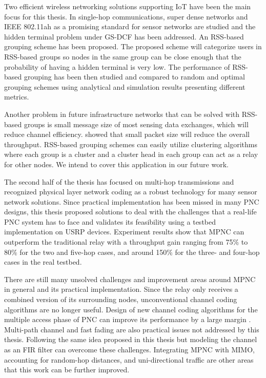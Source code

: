 \label{chapter:concl}

Two efficient wireless networking solutions supporting IoT have been the main focus for this thesis. In single-hop communications, super dense networks and IEEE 802.11ah as a promising standard for sensor networks are studied and the hidden terminal problem under GS-DCF has been addressed. An RSS-based grouping scheme has been proposed. The proposed scheme will categorize users in RSS-based groups so nodes in the same group can be close enough that the probability of having a hidden terminal is very low.
The performance of RSS-based grouping has been then studied and compared to random and optimal grouping schemes using analytical and simulation results presenting different metrics.

Another problem in future infrastructure networks that can be solved with RSS-based groups is small message size of most sensing data exchanges, which will reduce channel efficiency. \cite{bianchi2000performance} showed that small packet size will reduce the overall throughput. RSS-based grouping schemes can easily utilize clustering algorithms where each group is a cluster and a cluster head in each group can act as a relay for other nodes. We intend to cover this application in our future work.

The second half of the thesis has focused on multi-hop transmissions and recognized physical layer network coding as a robust technology for many sensor network solutions. Since practical implementation has been missed in many PNC designs, this thesis proposed solutions to deal with the challenges that a real-life PNC system has to face and validates its feasibility using a testbed implementation on USRP devices. Experiment results show that MPNC can outperform the traditional relay with a throughput gain ranging from 75\% to 80\% for the two and five-hop cases, and around 150\% for the three- and four-hop cases in the real testbed.

There are still many unsolved challenges and improvement areas around MPNC in general and its practical implementation. Since the relay only receives a combined version of its surrounding nodes, unconventional channel coding algorithms are no longer useful. Design of new channel coding algorithms for the multiple access phase of PNC can improve its performance by a large margin \cite{zhang2017design2}. Multi-path channel and fast fading are also practical issues not addressed by this thesis. Following the same idea proposed in this thesis but modeling the channel as an FIR filter can overcome these challenges. Integrating MPNC with MIMO, accounting for random-hop distances, and uni-directional traffic are other areas that this work can be further improved.